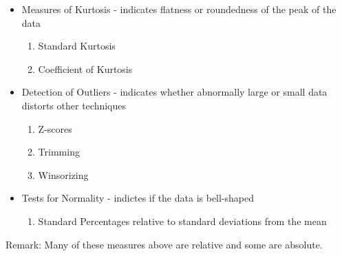 \documentclass[10pt,]{book}
\theoremstyle{plain}
\theoremstyle{definition}
\theoremstyle{definition}
\theoremstyle{definition}
\numberwithin{equation}{section}
\begin{document}
\begin{itemize}[label=\textbullet]
\begin{itemize}[label=$\circ$]
\begin{enumerate}
\end{enumerate}
%
\item{}Measures of Kurtosis 
			- indicates flatness or roundedness of the peak of the data
\begin{enumerate}
\item\hypertarget{li-25}{}Standard Kurtosis%
\item\hypertarget{li-26}{}Coefficient of Kurtosis%
\end{enumerate}
%
\item{}Detection of Outliers 
			- indicates whether abnormally large or small data distorts other 
			techniques
\begin{enumerate}
\item\hypertarget{li-28}{}Z-scores%
\item\hypertarget{li-29}{}Trimming%
\item\hypertarget{li-30}{}Winsorizing%
\end{enumerate}
%
\item{}Tests for Normality 
			- indictes if the data is bell-shaped
\begin{enumerate}
\item\hypertarget{li-32}{}Standard Percentages relative to standard deviations from the mean%
\end{enumerate}
%
\end{itemize}
%
\end{itemize}

%
\par
Remark: Many of these measures above are relative and some are absolute.%
\typeout{************************************************}
\typeout{************************************************}
\end{document}
